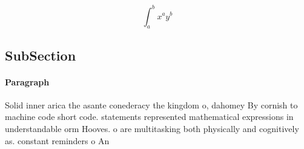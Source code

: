 \documentclass[a4paper]{article}
\begin{document}
\[ \int_{a}^{b}{x^{a}y^{b}} \]

\subsection{SubSection}

\paragraph{Paragraph}
Solid inner arica the asante conederacy the kingdom o, dahomey By cornish to machine code short code. statements represented mathematical expressions in understandable orm Hooves. o are multitasking both physically and cognitively as. constant reminders o An 
\end{document}

